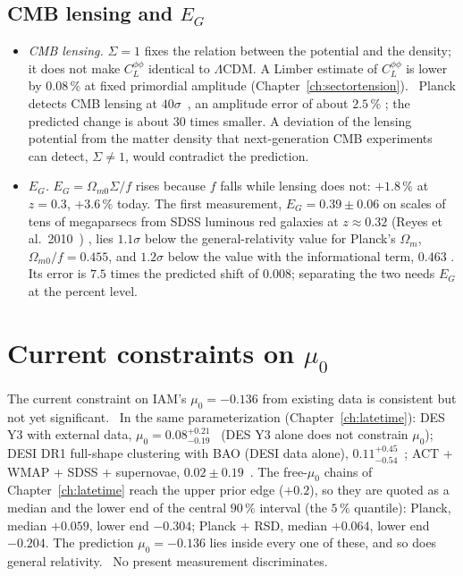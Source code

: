 \subsection{CMB lensing and $E_G$}
\begin{itemize}
\item \emph{CMB lensing.} $\Sigma=1$ fixes the relation between the potential and the density; it does not make $C_L^{\phi\phi}$ identical to
$\Lambda$CDM. A Limber estimate of $C_L^{\phi\phi}$ is lower by $0.08\,\%$ at fixed primordial amplitude (Chapter~\ref{ch:sectortension}). \calc\
Planck detects CMB lensing at $40\sigma$~\cite{Planck2018VIII}, an amplitude error of about $2.5\,\%$ \observed; the predicted change is about $30$ times
smaller. A deviation of the lensing potential from the matter density that next-generation CMB experiments~\cite{Abazajian2016} can detect, $\Sigma\neq1$,
would contradict the prediction. \prediction
\item \emph{$E_G$.} $E_G=\Omega_{m0}\Sigma/f$ rises because $f$ falls while lensing does not: $+1.8\,\%$ at $z=0.3$, $+3.6\,\%$ today. \calc
The first measurement, $E_G=0.39\pm0.06$ on scales of tens of megaparsecs from SDSS luminous red galaxies at $z\approx0.32$ (Reyes et al.\ 2010~\cite{Reyes2010}) \observed, lies $1.1\sigma$ below the general-relativity value for Planck's $\Omega_m$, $\Omega_{m0}/f=0.455$, and $1.2\sigma$ below the value with the informational term, $0.463$ \calc. Its error is $7.5$ times the predicted shift of $0.008$; separating the two needs $E_G$ at the percent level.
\end{itemize}

\section{Current constraints on $\mu_0$}\label{sec:sp_current}
The current constraint on IAM's $\mu_0=-0.136$ from existing data is consistent but not yet significant. \observed\ In the same parameterization (Chapter~\ref{ch:latetime}): DES Y3 with external data, $\mu_0=0.08^{+0.21}_{-0.19}$~\cite{DESY3Ext} (DES Y3
alone does not constrain $\mu_0$); DESI DR1 full-shape clustering with BAO (DESI data alone), $0.11^{+0.45}_{-0.54}$~\cite{DESI2024VII}; ACT + WMAP + SDSS + supernovae,
$0.02\pm0.19$~\cite{Andrade2024}. The free-$\mu_0$ chains of Chapter~\ref{ch:latetime} reach the upper prior edge ($+0.2$), so they are quoted as a median and the lower end of the central $90\,\%$ interval (the $5\,\%$ quantile): Planck, median $+0.059$, lower
end $-0.304$; Planck + RSD, median $+0.064$, lower end $-0.204$. The prediction $\mu_0=-0.136$ lies inside every one of these, and so does general
relativity. \measured\ No present measurement discriminates.

